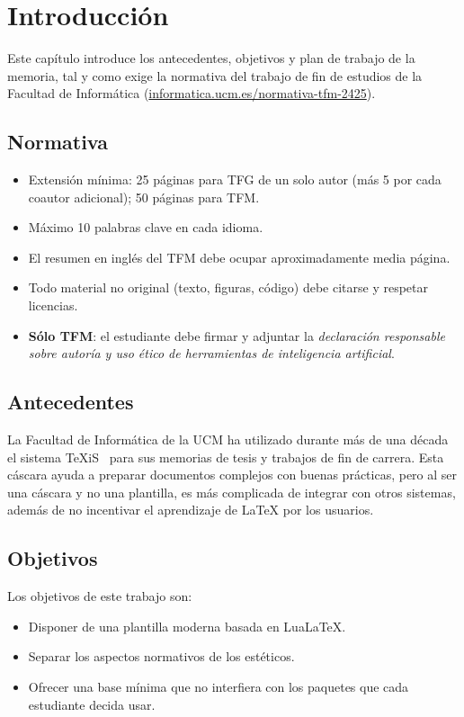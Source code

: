 \chapter{Introducción}

Este capítulo introduce los antecedentes, objetivos y plan de
trabajo de la memoria, tal y como exige la normativa del trabajo
de fin de estudios de la Facultad de Informática
(\href{https://informatica.ucm.es/normativa-tfm-2425}{informatica.ucm.es/normativa-tfm-2425}).

\section{Normativa}

\begin{itemize}\setlength{\itemsep}{0pt}
  \item Extensión mínima: 25 páginas para TFG de un solo autor (más
        5 por cada coautor adicional); 50 páginas para TFM.
  \item Máximo 10 palabras clave en cada idioma.
  \item El resumen en inglés del TFM debe ocupar
        aproximadamente media página.
  \item Todo material no original (texto, figuras, código) debe
        citarse y respetar licencias.
  \item \textbf{Sólo TFM}: el estudiante debe firmar y adjuntar la
        \emph{declaración responsable sobre autoría y uso ético de
        herramientas de inteligencia artificial}.
\end{itemize}

\section{Antecedentes}

La Facultad de Informática de la UCM ha utilizado durante más de
una década el sistema TeXiS~\cite{texis} para sus memorias de
tesis y trabajos de fin de carrera. Esta cáscara ayuda a preparar
documentos complejos con buenas prácticas, pero al ser una
cáscara y no una plantilla, es más complicada de integrar con
otros sistemas, además de no incentivar el aprendizaje de LaTeX
por los usuarios.

\section{Objetivos}

Los objetivos de este trabajo son:
\begin{itemize}
  \item Disponer de una plantilla moderna basada en LuaLaTeX.
  \item Separar los aspectos normativos de los estéticos.
  \item Ofrecer una base mínima que no interfiera con los
        paquetes que cada estudiante decida usar.
\end{itemize}
